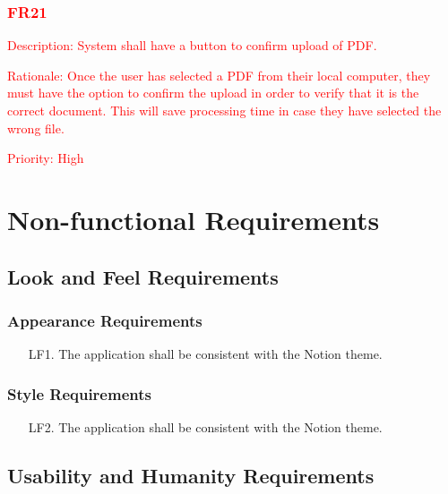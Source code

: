 \documentclass[12pt, titlepage]{article}
\begin{document}
\subsubsection{\textcolor{red}{FR21}}

\begin{description}
	\item \textcolor{red}{Description: System shall have a button to confirm upload of PDF.}
	\item \textcolor{red}{Rationale: Once the user has selected a PDF from their local computer, they must have the option to confirm the upload in order to verify that it is the correct document. This will save processing time in case they have selected the wrong file.}
	\item \textcolor{red}{Priority: High}
\end{description}


\section{Non-functional Requirements}

\subsection{Look and Feel Requirements}

\subsubsection{Appearance Requirements}

\begin{itemize}
  \item[LF1.] The application shall be consistent with the Notion theme. 
\end{itemize}

\subsubsection{Style Requirements}

\begin{itemize}
  \item[LF2.] The application shall be consistent with the Notion theme. 
\end{itemize}

\subsection{Usability and Humanity Requirements}
\end{document}
